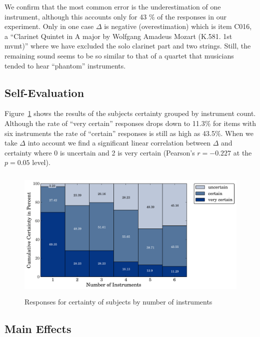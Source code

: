 We confirm \cite{huron89} that the most common error is the underestimation of one instrument, although this accounts only for 43 \% of the responses in our experiment. Only in one case $\Delta$ is negative (overestimation) which is item C016, a ``Clarinet Quintet in A major by Wolfgang Amadeus Mozart (K.581. 1st mvmt)'' where we have excluded the solo clarinet part and two strings. Still, the remaining sound seems to be so similar to that of a quartet that musicians tended to hear ``phantom'' instruments.
\vspace{-1.0em}

\subsection{Self-Evaluation}

Figure~\ref{fig:certainty} shows the results of the subjects certainty grouped by instrument count. Although the rate of ``very certain'' responses drops down to 11.3\% for items with six instruments the rate of ``certain'' responses is still as high as 43.5\%. When we take $\Delta$ into account we find a significant linear correlation between $\Delta$ and certainty where 0 is uncertain and 2 is very certain (Pearson's $r = -0.227$ at the $p=0.05$ level).

\begin{figure}[h]
	\centering
		\includegraphics[height=2.5in]{Chapters/07_Analysis_Experiment/ica/images/certainty.pdf}
	\caption{Responses for certainty of subjects by number of instruments}
	\label{fig:certainty}
\end{figure}

\subsection{Main Effects}

